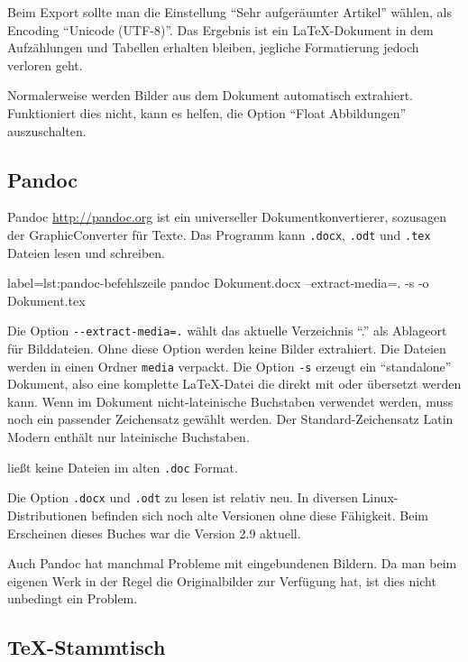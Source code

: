 {Beim Export sollte man die Einstellung \enquote{Sehr aufgeräumter Artikel}
wählen, als Encoding \enquote{Unicode (UTF-8)}.  Das Ergebnis ist ein
\LaTeX{}-Dokument in dem Aufzählungen und Tabellen erhalten bleiben,
jegliche Formatierung jedoch verloren geht.

Normalerweise werden Bilder aus dem Dokument automatisch extrahiert.
Funktioniert dies nicht, kann es helfen, die Option \enquote{Float Abbildungen} auszuschalten.

\subsection{Pandoc}

Pandoc \url{http://pandoc.org} ist ein universeller Dokumentkonvertierer, sozusagen der GraphicConverter für Texte.
Das Programm kann \texttt{.docx}, \texttt{.odt} und \texttt{.tex} Dateien lesen und schreiben.

\begin{lfgwcode}{label={lst:pandoc-befehlszeile}}
pandoc Dokument.docx --extract-media=. -s -o Dokument.tex
\end{lfgwcode}

Die Option \texttt{-{}-extract-media=.} wählt das aktuelle Verzeichnis \enquote{.} als Ablageort für Bilddateien.
Ohne diese Option werden keine Bilder extrahiert.
Die Dateien werden in einen Ordner \texttt{media} verpackt.
Die Option \texttt{-s} erzeugt ein \enquote{standalone} Dokument, also eine komplette \LaTeX{}-Datei die direkt
mit  oder  übersetzt werden kann.
Wenn im Dokument nicht-lateinische Buchstaben verwendet werden, muss noch ein passender Zeichensatz gewählt werden.
Der Standard-Zeichensatz Latin Modern enthält nur lateinische Buchstaben.

 ließt keine Dateien im alten \texttt{.doc} Format.

Die Option \texttt{.docx} und \texttt{.odt} zu lesen ist relativ neu.
In diversen Linux-Distributionen befinden sich noch alte Versionen ohne diese Fähigkeit.
Beim Erscheinen dieses Buches war die Version 2.9 aktuell.

Auch Pandoc hat manchmal Probleme mit eingebundenen Bildern.
Da man beim eigenen Werk in der Regel die Originalbilder zur Verfügung hat, ist dies nicht unbedingt ein Problem.

\subsection{\TeX{}-Stammtisch}

}
